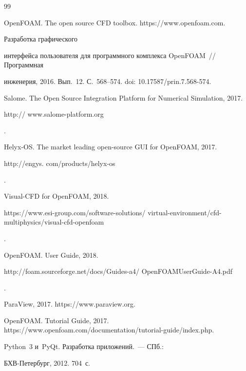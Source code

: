 {\small\frenchspacing


{%




\begin{thebibliography}{99}




  OpenFOAM. The open source CFD toolbox. {\sf https://www.openfoam.com}.




   Разработка графического 


интерфейса пользователя для программного комплекса OpenFOAM~/\!\!/ Программная 


инженерия, 2016. Вып.~12.  С.~568--574. doi: 10.17587/prin.7.568-574.




  Salome. The Open Source Integration Platform for Numerical Simulation, 2017. {\sf  


http:// www.salome-platform.org}.




  Helyx-OS. The market leading open-source GUI for OpenFOAM, 2017. {\sf 


http://engys. com/products/helyx-os}.




  Visual-CFD for OpenFOAM, 2018. {\sf  


https://www.esi-group.com/software-solutions/ virtual-environment/cfd-multiphysics/visual-cfd-openfoam}.




  OpenFOAM. User Guide, 2018. {\sf  


http://foam.sourceforge.net/docs/Guides-a4/ OpenFOAMUserGuide-A4.pdf}.




  ParaView, 2017. {\sf https://www.paraview.org}.




  OpenFOAM. Tutorial Guide, 2017. {\sf https://www.openfoam.com/documentation/\linebreak tutorial-guide/index.php}.




   Python~3 и~PyQt. Разработка приложений.~--- СПб.:  


БХВ-Пе\-тер\-бург, 2012. 704~с.



\end{thebibliography}}}
